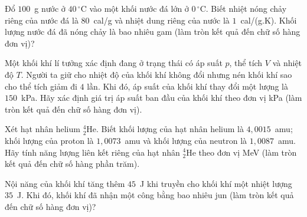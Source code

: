 	\begin{ex}%
		Đổ $100$~g nước ở $40\,^\circ\text{C}$ vào một khối nước đá lớn ở $0\,^\circ\text{C}$. Biết nhiệt nóng chảy riêng của nước đá là $80$~cal/g và nhiệt dung riêng của nước là $1$~cal/(g.K). Khối lượng nước đá đã nóng chảy là bao nhiêu gam (làm tròn kết quả đến chữ số hàng đơn vị)?
		\par
	\end{ex}

	\begin{ex}%
		Một khối khí lí tưởng xác định đang ở trạng thái có áp suất $p$, thể tích $V$ và nhiệt độ $T$. Người ta giữ cho nhiệt độ của khối khí không đổi nhưng nén khối khí sao cho thể tích giảm đi $4$ lần. Khi đó, áp suất của khối khí thay đổi một lượng là $150$~kPa. Hãy xác định giá trị áp suất ban đầu của khối khí theo đơn vị kPa (làm tròn kết quả đến chữ số hàng đơn vị).
		\par
	\end{ex}

	\begin{ex}%
		Xét hạt nhân helium ${}^4_2\text{He}$. Biết khối lượng của hạt nhân helium là $4{,}0015$~amu; khối lượng của proton là $1{,}0073$~amu và khối lượng của neutron là $1{,}0087$~amu. Hãy tính năng lượng liên kết riêng của hạt nhân ${}^4_2\text{He}$ theo đơn vị MeV (làm tròn kết quả đến chữ số hàng phần trăm).
		\par
	\end{ex}

	\begin{ex}%
		Nội năng của khối khí tăng thêm $45$~J khi truyền cho khối khí một nhiệt lượng $35$~J. Khi đó, khối khí đã nhận một công bằng bao nhiêu jun (làm tròn kết quả đến chữ số hàng đơn vị)?
		\par
	\end{ex}

